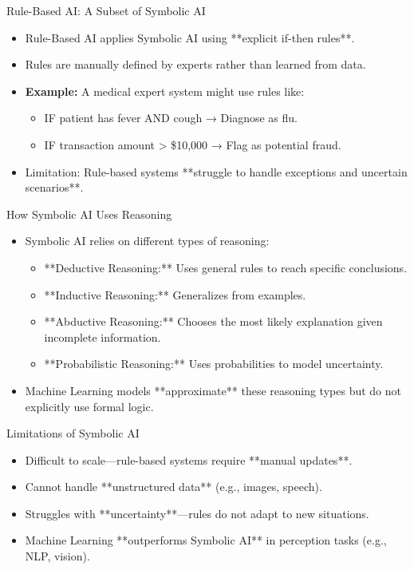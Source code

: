 \documentclass{beamer}
\begin{document}
\begin{frame}{Rule-Based AI: A Subset of Symbolic AI}
    \begin{itemize}
        \item Rule-Based AI applies Symbolic AI using **explicit if-then rules**.
        \item Rules are manually defined by experts rather than learned from data.
        \item \textbf{Example:} A medical expert system might use rules like:
        \begin{itemize}
            \item IF patient has fever AND cough → Diagnose as flu.
            \item IF transaction amount > \$10,000 → Flag as potential fraud.
        \end{itemize}
        \item Limitation: Rule-based systems **struggle to handle exceptions and uncertain scenarios**.
    \end{itemize}
\end{frame}

\begin{frame}{How Symbolic AI Uses Reasoning}
    \begin{itemize}
        \item Symbolic AI relies on different types of reasoning:
        \begin{itemize}
            \item **Deductive Reasoning:** Uses general rules to reach specific conclusions.
            \item **Inductive Reasoning:** Generalizes from examples.
            \item **Abductive Reasoning:** Chooses the most likely explanation given incomplete information.
            \item **Probabilistic Reasoning:** Uses probabilities to model uncertainty.
        \end{itemize}
        \item Machine Learning models **approximate** these reasoning types but do not explicitly use formal logic.
    \end{itemize}
\end{frame}

\begin{frame}{Limitations of Symbolic AI}
    \begin{itemize}
        \item Difficult to scale—rule-based systems require **manual updates**.
        \item Cannot handle **unstructured data** (e.g., images, speech).
        \item Struggles with **uncertainty**—rules do not adapt to new situations.
        \item Machine Learning **outperforms Symbolic AI** in perception tasks (e.g., NLP, vision).
    \end{itemize}
\end{frame}
\end{document}
